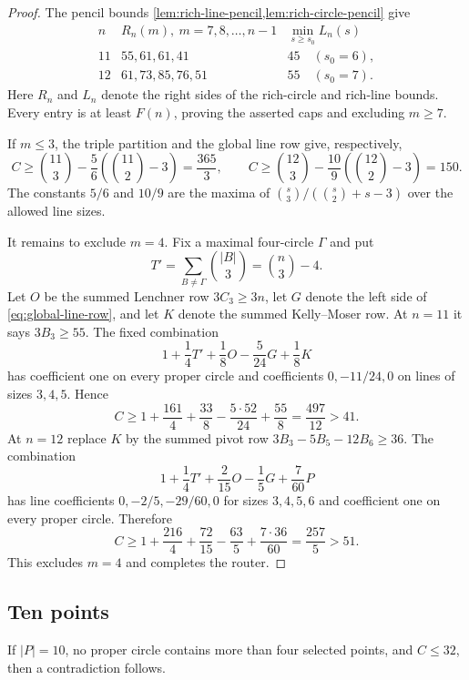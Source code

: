 \begin{proof}
The pencil bounds \cref{lem:rich-line-pencil,lem:rich-circle-pencil} give
\begin{equation}
\begin{array}{c|c|c}
n& R_n(m),\ m=7,8,\ldots,n-1&
       \min_{s\ge s_0}L_n(s)\\ \hline
11&55,61,61,41&45\quad(s_0=6),\\
12&61,73,85,76,51&55\quad(s_0=7).
\end{array}\label{eq:outer-rich-values}
\end{equation}
Here $R_n$ and $L_n$ denote the right sides of the rich-circle and
rich-line bounds.  Every entry is at least $F(n)$, proving the asserted
caps and excluding $m\ge7$.

If $m\le3$, the triple partition and the global line row give, respectively,
\[
 C\ge \binom{11}{3}-\frac56\left(\binom{11}{2}-3\right)
 =\frac{365}{3},
\qquad
 C\ge \binom{12}{3}-\frac{10}{9}\left(\binom{12}{2}-3\right)=150.
\]
The constants $5/6$ and $10/9$ are the maxima of
$\binom{s}{3}/(\binom{s}{2}+s-3)$ over the allowed line sizes.

It remains to exclude $m=4$.  Fix a maximal four-circle $\Gamma$ and put
\[
 T'=\sum_{B\ne\Gamma}\binom{|B|}{3}=\binom n3-4.
\]
Let $O$ be the summed Lenchner row $3C_3\ge3n$, let $G$ denote the
left side of \eqref{eq:global-line-row}, and let $K$ denote the summed
Kelly--Moser row.  At $n=11$ it says $3B_3\ge55$.  The fixed combination
\[
 1+\frac14T'+\frac18O-\frac5{24}G+\frac18K
\]
has coefficient one on every proper circle and coefficients
$0,-11/24,0$ on lines of sizes $3,4,5$.  Hence
\[
 C\ge1+\frac{161}{4}+\frac{33}{8}-\frac{5\cdot52}{24}+\frac{55}{8}
 =\frac{497}{12}>41.
\]
At $n=12$ replace $K$ by the summed pivot row
$3B_3-5B_5-12B_6\ge36$.  The combination
\[
 1+\frac14T'+\frac2{15}O-\frac15G+\frac7{60}P
\]
has line coefficients $0,-2/5,-29/60,0$ for sizes $3,4,5,6$ and
coefficient one on every proper circle.  Therefore
\[
 C\ge1+\frac{216}{4}+\frac{72}{15}-\frac{63}{5}+\frac{7\cdot36}{60}
 =\frac{257}{5}>51.
\]
This excludes $m=4$ and completes the router.
\end{proof}

\subsection{Ten points}

\begin{lemma}
\label{lem:n10-gamma4}
If $|P|=10$, no proper circle contains more than four selected points, and
$C\le32$, then a contradiction follows.
\end{lemma}

